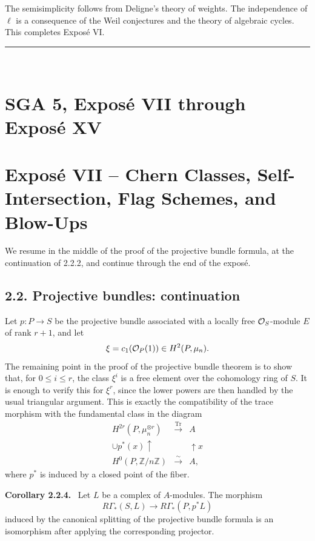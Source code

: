 \documentclass[11pt]{article}
\theoremstyle{plain}
\theoremstyle{definition}
\theoremstyle{remark}
\newenvironment{statement}[1]{\par\medskip\noindent\textbf{#1.}\ }{\par\medskip}
\newcommand{\ZZ}{\mathbb Z}
\DeclareMathOperator{\Tr}{Tr}
\begin{document}
The semisimplicity follows from Deligne's theory of weights. The independence of
$\ell$ is a consequence of the Weil conjectures and the theory of algebraic cycles.
This completes Exposé VI.

\bigskip
\begin{center}
\rule{0.45\textwidth}{0.4pt}\\[0.5em]
\end{center}


\clearpage
\section*{SGA 5, Exposé VII through Exposé XV}

\bigskip
\section*{Expos\'e VII -- Chern Classes, Self-Intersection, Flag Schemes, and Blow-Ups}

\noindent We resume in the middle of the proof of the projective bundle formula, at the continuation of 2.2.2, and continue through the end of the expos\'e.

\subsection*{2.2. Projective bundles: continuation}

Let $p:P\to S$ be the projective bundle associated with a locally free $\mathcal O_S$-module $E$ of rank $r+1$, and let
\[
   \xi=c_1(\mathcal O_P(1))\in H^2(P,\mu_n).
\]
The remaining point in the proof of the projective bundle theorem is to show that, for $0\le i\le r$, the class $\xi^i$ is a free element over the cohomology ring of $S$. It is enough to verify this for $\xi^r$, since the lower powers are then handled by the usual triangular argument. This is exactly the compatibility of the trace morphism with the fundamental class in the diagram
\[
\begin{array}{ccc}
H^{2r}(P,\mu_n^{\otimes r}) & \xrightarrow{\Tr} & A \\
\cup p^*(x)\uparrow && \uparrow x \\
H^0(P,\ZZ/n\ZZ) & \xrightarrow{\sim} & A,
\end{array}
\]
where $p^*$ is induced by a closed point of the fiber.

\begin{statement}{Corollary 2.2.4}
Let $L$ be a complex of $A$-modules. The morphism
\[
   R\Gamma_*(S,L)\longrightarrow R\Gamma_*(P,p^*L)
\]
induced by the canonical splitting of the projective bundle formula is an isomorphism after applying the corresponding projector.
\end{statement}
\end{document}

